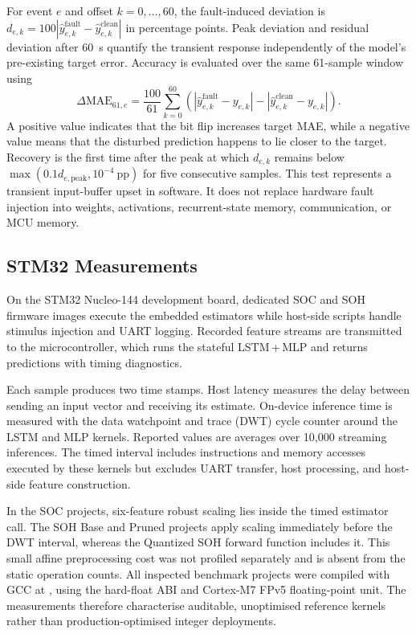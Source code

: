 \documentclass[review]{elsarticle}
\newcommand{\code}[1]{\path{#1}}
\begin{document}
For event $e$ and offset $k=0,\ldots,60$, the fault-induced deviation is $d_{e,k}=100|\hat{y}^{\mathrm{fault}}_{e,k}-\hat{y}^{\mathrm{clean}}_{e,k}|$ in percentage points. Peak deviation and residual deviation after 60~s quantify the transient response independently of the model's pre-existing target error. Accuracy is evaluated over the same 61-sample window using
\begin{equation}
\Delta\mathrm{MAE}_{61,e}=\frac{100}{61}\sum_{k=0}^{60}\left(\left|\hat{y}^{\mathrm{fault}}_{e,k}-y_{e,k}\right|-\left|\hat{y}^{\mathrm{clean}}_{e,k}-y_{e,k}\right|\right).
\label{eq:fault_mae_change}
\end{equation}
A positive value indicates that the bit flip increases target MAE, while a negative value means that the disturbed prediction happens to lie closer to the target. Recovery is the first time after the peak at which $d_{e,k}$ remains below $\max(0.1d_{e,\mathrm{peak}},10^{-4}\ \mathrm{pp})$ for five consecutive samples. This test represents a transient input-buffer upset in software. It does not replace hardware fault injection into weights, activations, recurrent-state memory, communication, or MCU memory.

\subsection{STM32 Measurements}
On the STM32 Nucleo-144 development board, dedicated SOC and SOH firmware images execute the embedded estimators while host-side scripts handle stimulus injection and UART logging. Recorded feature streams are transmitted to the microcontroller, which runs the stateful LSTM\,+\,MLP and returns predictions with timing diagnostics.

Each sample produces two time stamps. Host latency measures the delay between sending an input vector and receiving its estimate. On-device inference time is measured with the data watchpoint and trace (DWT) cycle counter around the LSTM and MLP kernels. Reported values are averages over 10,000 streaming inferences. The timed interval includes instructions and memory accesses executed by these kernels but excludes UART transfer, host processing, and host-side feature construction.

In the SOC projects, six-feature robust scaling lies inside the timed estimator call. The SOH Base and Pruned projects apply scaling immediately before the DWT interval, whereas the Quantized SOH forward function includes it. This small affine preprocessing cost was not profiled separately and is absent from the static operation counts. All inspected benchmark projects were compiled with GCC at \code{-O0}, using the hard-float ABI and Cortex-M7 FPv5 floating-point unit. The measurements therefore characterise auditable, unoptimised reference kernels rather than production-optimised integer deployments.
\end{document}
